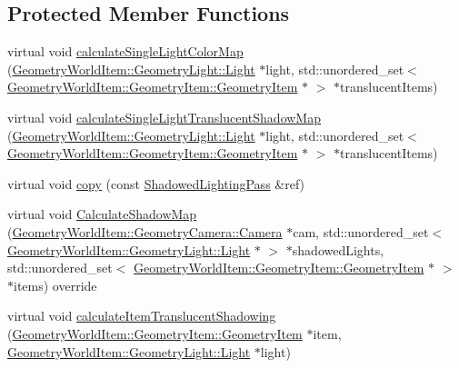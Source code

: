 \subsection*{Protected Member Functions}
\begin{DoxyCompactItemize}
\item 
virtual void \mbox{\hyperlink{class_geometry_engine_1_1_geometry_render_step_1_1_transparent_shadowed_lighting_pass_a651aad2a6704f45bc1562df549024178}{calculate\+Single\+Light\+Color\+Map}} (\mbox{\hyperlink{class_geometry_engine_1_1_geometry_world_item_1_1_geometry_light_1_1_light}{Geometry\+World\+Item\+::\+Geometry\+Light\+::\+Light}} $\ast$light, std\+::unordered\+\_\+set$<$ \mbox{\hyperlink{class_geometry_engine_1_1_geometry_world_item_1_1_geometry_item_1_1_geometry_item}{Geometry\+World\+Item\+::\+Geometry\+Item\+::\+Geometry\+Item}} $\ast$ $>$ $\ast$translucent\+Items)
\item 
virtual void \mbox{\hyperlink{class_geometry_engine_1_1_geometry_render_step_1_1_transparent_shadowed_lighting_pass_a2b57824704b0e211133de03e788373a3}{calculate\+Single\+Light\+Translucent\+Shadow\+Map}} (\mbox{\hyperlink{class_geometry_engine_1_1_geometry_world_item_1_1_geometry_light_1_1_light}{Geometry\+World\+Item\+::\+Geometry\+Light\+::\+Light}} $\ast$light, std\+::unordered\+\_\+set$<$ \mbox{\hyperlink{class_geometry_engine_1_1_geometry_world_item_1_1_geometry_item_1_1_geometry_item}{Geometry\+World\+Item\+::\+Geometry\+Item\+::\+Geometry\+Item}} $\ast$ $>$ $\ast$translucent\+Items)
\item 
virtual void \mbox{\hyperlink{class_geometry_engine_1_1_geometry_render_step_1_1_transparent_shadowed_lighting_pass_ab88135daf4e0001a39ce4d9b4b7ff197}{copy}} (const \mbox{\hyperlink{class_geometry_engine_1_1_geometry_render_step_1_1_shadowed_lighting_pass}{Shadowed\+Lighting\+Pass}} \&ref)
\item 
virtual void \mbox{\hyperlink{class_geometry_engine_1_1_geometry_render_step_1_1_transparent_shadowed_lighting_pass_ad366c618c891de5c541b6d75db6a9594}{Calculate\+Shadow\+Map}} (\mbox{\hyperlink{class_geometry_engine_1_1_geometry_world_item_1_1_geometry_camera_1_1_camera}{Geometry\+World\+Item\+::\+Geometry\+Camera\+::\+Camera}} $\ast$cam, std\+::unordered\+\_\+set$<$ \mbox{\hyperlink{class_geometry_engine_1_1_geometry_world_item_1_1_geometry_light_1_1_light}{Geometry\+World\+Item\+::\+Geometry\+Light\+::\+Light}} $\ast$ $>$ $\ast$shadowed\+Lights, std\+::unordered\+\_\+set$<$ \mbox{\hyperlink{class_geometry_engine_1_1_geometry_world_item_1_1_geometry_item_1_1_geometry_item}{Geometry\+World\+Item\+::\+Geometry\+Item\+::\+Geometry\+Item}} $\ast$ $>$ $\ast$items) override
\item 
virtual void \mbox{\hyperlink{class_geometry_engine_1_1_geometry_render_step_1_1_transparent_shadowed_lighting_pass_acc1bb4b92b2c46deefca7db48645d6ef}{calculate\+Item\+Translucent\+Shadowing}} (\mbox{\hyperlink{class_geometry_engine_1_1_geometry_world_item_1_1_geometry_item_1_1_geometry_item}{Geometry\+World\+Item\+::\+Geometry\+Item\+::\+Geometry\+Item}} $\ast$item, \mbox{\hyperlink{class_geometry_engine_1_1_geometry_world_item_1_1_geometry_light_1_1_light}{Geometry\+World\+Item\+::\+Geometry\+Light\+::\+Light}} $\ast$light)
\end{DoxyCompactItemize}

